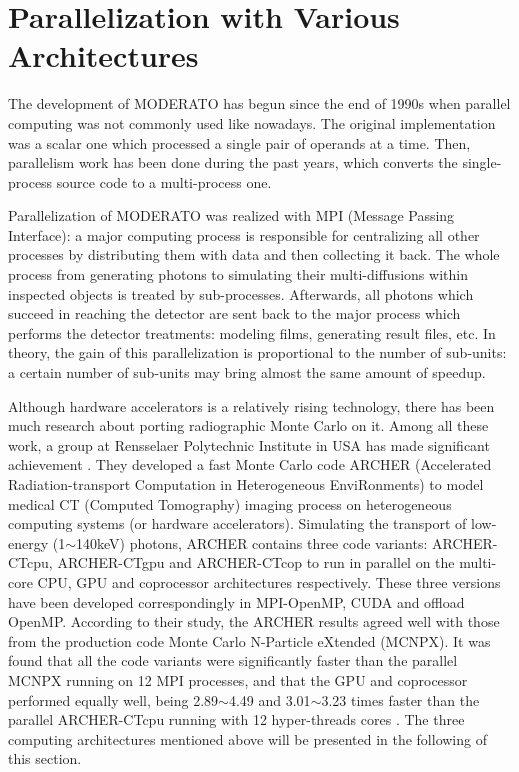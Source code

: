 
\section{Parallelization with Various Architectures}
The development of MODERATO has begun since the end of 1990s when parallel computing was not commonly used like nowadays. The original implementation was a scalar one which processed a single pair of operands at a time. Then, parallelism work has been done during the past years, which converts the single-process source code to a multi-process one.

Parallelization of MODERATO was realized with MPI (Message Passing Interface): a major computing process is responsible for centralizing all other processes by distributing them with data and then collecting it back. The whole process from generating photons to simulating their multi-diffusions within inspected objects is treated by sub-processes. Afterwards, all photons which succeed in reaching the detector are sent back to the major process which performs the detector treatments: modeling films, generating result files, etc. In theory, the gain of this parallelization is proportional to the number of sub-units: a certain number of sub-units may bring almost the same amount of speedup.

Although hardware accelerators is a relatively rising technology, there has been much research about porting radiographic Monte Carlo on it. Among all these work, a group at Rensselaer Polytechnic Institute in USA has made significant achievement \citep{xu2013update, liu2014comparison, su2014archerrt, liu2013tu}. They developed a fast Monte Carlo code ARCHER (Accelerated Radiation-transport Computation in Heterogeneous EnviRonments) to model medical CT (Computed Tomography) imaging process on heterogeneous computing systems (or hardware accelerators). Simulating the transport of low-energy (1$\sim$140keV) photons, ARCHER contains three code variants: ARCHER-CTcpu, ARCHER-CTgpu and ARCHER-CTcop to run in parallel on the multi-core CPU, GPU and coprocessor architectures respectively. These three versions have been developed correspondingly in MPI-OpenMP, CUDA and offload OpenMP. According to their study, the ARCHER results agreed well with those from the production code Monte Carlo N-Particle eXtended (MCNPX). It was found that all the code variants were significantly faster than the parallel MCNPX running on 12 MPI processes, and that the GPU and coprocessor performed equally well, being 2.89$\sim$4.49 and 3.01$\sim$3.23 times faster than the parallel ARCHER-CTcpu running with 12 hyper-threads cores \citep{liu2014comparison}. The three computing architectures mentioned above will be presented in the following of this section.

